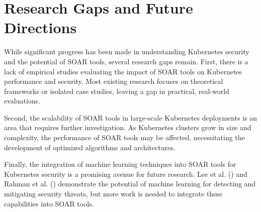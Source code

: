 

\chapter{Research Gaps and Future Directions} \label{cha:researchGapsAndFutureDirections}

While significant progress has been made in understanding Kubernetes security and the potential of SOAR tools, several research gaps remain. First, there is a lack of empirical studies evaluating the impact of SOAR tools on Kubernetes performance and security. Most existing research focuses on theoretical frameworks or isolated case studies, leaving a gap in practical, real-world evaluations.

Second, the scalability of SOAR tools in large-scale Kubernetes deployments is an area that requires further investigation. As Kubernetes clusters grow in size and complexity, the performance of SOAR tools may be affected, necessitating the development of optimized algorithms and architectures.

Finally, the integration of machine learning techniques into SOAR tools for Kubernetes security is a promising avenue for future research. Lee et al. (\citeyear{lee_experimental_2023}) and Rahman et al. (\citeyear{rahman_security_2023}) demonstrate the potential of machine learning for detecting and mitigating security threats, but more work is needed to integrate these capabilities into SOAR tools.
